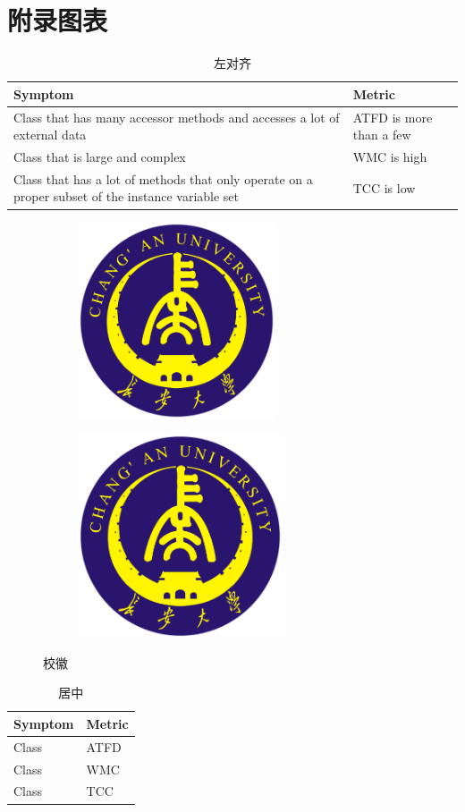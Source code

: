 \chapter{附录图表}

\begin{table}[H]
    \caption{左对齐}
    \begin{tabularx}{\textwidth}{XX}
    \toprule
        \textbf{Symptom} & \textbf{Metric} \\
    \midrule
        Class that has many accessor methods and accesses a lot of external data & ATFD is more than a few\\
        Class that is large and complex & WMC is high\\
        Class that has a lot of methods that only operate on a proper subset of the instance variable set & TCC is low\\
    \bottomrule
    \end{tabularx}
\end{table}

\begin{figure}[H]
    \begin{subfigure}[b]{0.49\linewidth}
        \centering
        \includegraphics[height=5.8cm]{./figures/chdcolorlogo.pdf}
    \end{subfigure}
    \begin{subfigure}[b]{0.49\linewidth}
        \centering
        \includegraphics[height=6cm]{./figures/chdcolorlogo.pdf}
        \label{subfig:app-icon}
    \end{subfigure}
    \caption{校徽}
\end{figure}


\begin{table}[H]
    \caption{居中}
    \begin{tabularx}{\textwidth}{YY}
    \toprule
        \textbf{Symptom} & \textbf{Metric} \\
    \midrule
        Class  & ATFD \\
        Class  & WMC \\
        Class  & TCC \\
    \bottomrule
    \end{tabularx}
\end{table}



